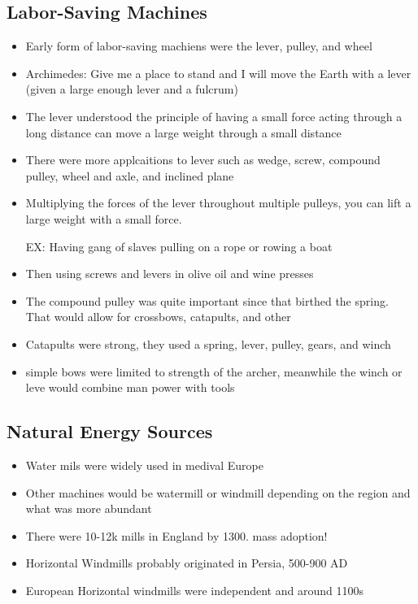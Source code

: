 \documentclass{article}
\begin{document}
\subsection{Labor-Saving Machines}
\begin{itemize}
  \item Early form of labor-saving machiens were the
    lever, pulley, and wheel
  \item Archimedes: Give me a place to stand and I will move the Earth
    with a lever (given a large enough lever and a fulcrum)
  \item The lever understood the principle of having a small force acting through a long distance
    can move a large weight through a small distance
  \item There were more applcaitions to lever such as
    wedge, screw, compound pulley, wheel and axle, and inclined plane
  \item Multiplying the forces of the lever throughout multiple
    pulleys, you can lift a large weight with a small force.

    EX: Having gang of slaves pulling on a rope or rowing a boat
  \item Then using screws and levers in olive oil and wine presses
  \item The compound pulley was quite important since that birthed the spring.
    That would allow for crossbows, catapults, and other
  \item Catapults were strong, they used a
    spring, lever, pulley, gears, and winch
  \item simple bows were limited to strength of the archer,
    meanwhile the winch or leve would combine man power with tools
\end{itemize}

\subsection{Natural Energy Sources}
\begin{itemize}
  \item Water mils were widely used in medival Europe
  \item Other machines would be watermill or windmill
    depending on the region and what was more abundant
  \item There were 10-12k mills in England by 1300.
    mass adoption!
  \item Horizontal Windmills probably originated in Persia, 500-900 AD
  \item European Horizontal windmills were independent and around 1100s
\end{itemize}
\end{document}
